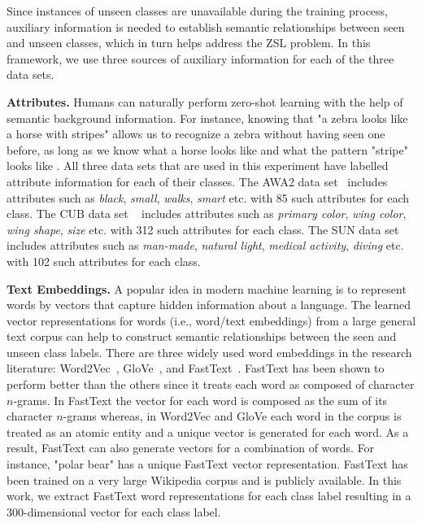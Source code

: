 
Since instances of unseen classes are unavailable during the training process, auxiliary information is needed to establish semantic relationships between seen and unseen classes, which in turn helps address the ZSL problem. In this framework, we use three sources of auxiliary information for each of the three data sets.

\par
\medskip

\textbf{Attributes.} Humans can naturally perform zero-shot learning with the help of semantic background information. For instance, knowing that "a zebra looks like a horse with stripes" allows us to recognize a zebra without having seen one before, as long as we know what a horse looks like and what the pattern "stripe" looks like \cite{stripes}. All three data sets that are used in this experiment have labelled attribute information for each of their classes. The AWA2 data set~ \cite{awa} includes attributes such as \textit{black}, \textit{small}, \textit{walks}, \textit{smart} etc. with 85 such attributes for each class. The CUB data set ~\cite{cub} includes attributes such as \textit{primary color}, \textit{wing color}, \textit{wing shape}, \textit{size} etc. with 312 such attributes for each class. The SUN data set~\cite{sun} includes attributes such as \textit{man-made}, \textit{natural light}, \textit{medical activity}, \textit{diving} etc. with 102 such attributes for each class.

\par
\medskip

\textbf{Text Embeddings.} A popular idea in modern machine learning is to represent words by vectors that capture hidden information about a language. The learned vector representations for words (i.e., word/text embeddings) from a large general text corpus can help to construct semantic relationships between the seen and unseen class labels. There are three  widely used word embeddings in the research literature: Word2Vec~\cite{w2v}, GloVe~\cite{glove}, and FastText~\cite{fasttext}. FastText has been shown to perform better than the others since it treats each word as composed of character $n$-grams. In FastText the vector for each word is composed as the sum of its character $n$-grams whereas, in Word2Vec and GloVe each word in the corpus is treated as an atomic entity and a unique vector is generated for each word. As a result, FastText can also generate vectors for a combination of words. For instance, "polar bear" has a unique FastText vector representation. FastText has been trained on a very large Wikipedia corpus and is publicly available. In this work, we extract FastText word representations for each class label resulting in a 300-dimensional vector for each class label. 

